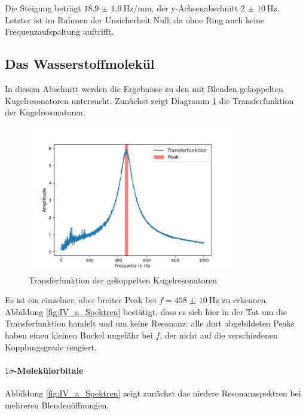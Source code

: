 \documentclass[../main.tex]{subfiles}
\begin{document}
        Die Steigung beträgt $\SI{18.9(19)}{\hertz\per\milli\metre}$, der y-Achsenabschnitt $\SI{2(10)}{\hertz}$. Letzter ist im Rahmen der Unsicherheit Null, da ohne Ring auch keine Frequenzaufspaltung auftrifft.

\subsection{Das Wasserstoffmolekül}
    In diesem Abschnitt werden die Ergebnisse zu den mit Blenden gekoppelten Kugelresonatoren untersucht. Zunächst zeigt Diagramm \ref{fig:IV_Transferfunktion} die Transferfunktion der Kugelresonatoren.

    \begin{figure}[H]
        \centering
        \includegraphics[width=0.8\textwidth]{Bilddateien/Auswertung/IV_Transferfunktion.jpg}
        \caption{Transferfunktion der gekoppelten Kugelresonatoren}
        \label{fig:IV_Transferfunktion}
    \end{figure}

    Es ist ein einzelner, aber breiter Peak bei $f=\SI{458(10)}{\hertz}$ zu erkennen. Abbildung \ref{fig:IV_a_Spektren} bestätigt, dass es sich hier in der Tat um die Transferfunktion handelt und um keine Resonanz: alle dort abgebildeten Peaks haben einen kleinen Buckel ungefähr bei $f$, der nicht auf die verschiedenen Kopplungsgrade reagiert.
    
    
    \paragraph{$1\sigma$-Molekülorbitale}
        Abbildung \ref{fig:IV_a_Spektren} zeigt zunächst das niedere Resonanzspektren bei mehreren Blendenöffnungen.
\end{document}
